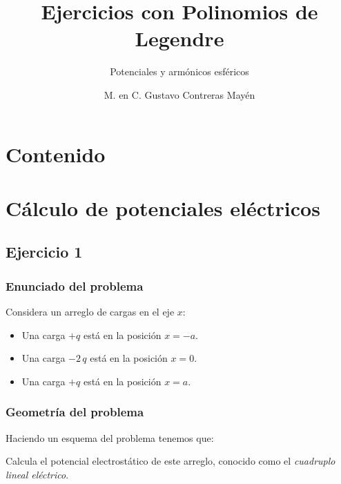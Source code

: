
\usepackage{anyfontsize}
\title{\large{Ejercicios con Polinomios de Legendre}}
\subtitle{Potenciales y armónicos esféricos}
\author{M. en C. Gustavo Contreras Mayén}
\date{}

\maketitle
\fontsize{14}{14}\selectfont
{}
\section*{Contenido}
\section{Cálculo de potenciales eléctricos}
\subsection{Ejercicio 1}
\begin{frame}
\frametitle{Enunciado del problema}
Considera un arreglo de cargas en el eje $x$:
\begin{itemize}
\item Una carga $+q$ está en la posición $x = -a$.
\item Una carga $-2 \, q$ está en la posición $x = 0$.
\item Una carga $+q$ está en la posición $x = a$.
\end{itemize}
\end{frame}
\begin{frame}
\frametitle{Geometría del problema}
Haciendo un esquema del problema tenemos que:
\begin{figure}
    \centering
    
\end{figure}
\pause
Calcula el potencial electrostático de este arreglo, conocido como el \emph{cuadruplo lineal eléctrico}.
\end{frame}
